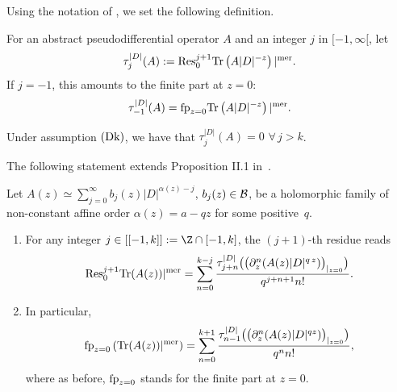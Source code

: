 Using the notation of \cite{CoMo}, we set the following def\/inition.
\begin{definition}
 For an abstract pseudodif\/ferential operator $  A$ and an integer  $j$ in $ [-1, \infty[$, let
 \begin{gather}\label{eq:taukD}
\tau^{\vert D\vert}_j(A):={\rm Res}^{j+1}_{0} {\rm
    Tr} \left( A  \vert D\vert^{-z}\right)\vert^{\rm mer}.
\end{gather}
If $j=-1$, this amounts to the f\/inite part at $z=0$:
\[
\tau^{\vert D\vert}_{-1}(A)= {\rm fp}_{z=0} {\rm
    Tr} \left( A  \vert D\vert^{-z}\right)\vert^{\rm mer}.
    \]
\end{definition}
\begin{remark}  Under assumption ${\rm (Dk)}$, we have that
$\tau^{\vert D\vert}_j(A)=0$ $ \forall\, j> k$.
\end{remark}

 The
following statement extends Proposition II.1 in~\cite{CoMo}.

\begin{theorem} \label{thm:ResAz} Let $A(z)\simeq \sum\limits_{j=0}^\infty
b_j(z) \vert D\vert^{\alpha(z)-j}$, $b_j(z)\in {\cal B}$, be a holomorphic
family of non-constant affine order
  $\alpha(z)=a-q  z$ for some positive~$q$.
\begin{enumerate}
\itemsep=0pt
\item For any integer $j\in [[-1, k]]:= \Z\cap [-1, k]$, the  $(j+1)$-th residue reads
 \begin{gather*}%
{\rm Res}^{j+1}_{0} {\rm Tr}(A(z))\vert^{\rm mer}= \sum_{n=0}^{k-j}
\frac{\tau_{j+n}^{\vert D\vert}\big(\big(\partial_z^n (A(z)
  \vert D\vert^{q\, z})\big)_{\vert_{z=0}}\big)}{q^{j+n+1}  n!}.
\end{gather*}
\item In particular,
\[
{\rm fp}_{z=0}\left( {\rm Tr}(A(z))\vert^{\rm mer}\right)=
\sum_{n=0}^{k+1}
\frac{\tau_{n-1}^{\vert D\vert}\big(\big(\partial_z^n (A(z)
  \vert D\vert^{q z})\big)_{\vert_{z=0}}\big)}{q^{n}  n!},
\] where as before, ${\rm fp}_{z=0}$ stands for the finite part at $z=0$.
\end{enumerate}
\end{theorem}

